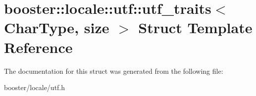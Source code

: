 \section{booster\+:\+:locale\+:\+:utf\+:\+:utf\+\_\+traits$<$ Char\+Type, size $>$ Struct Template Reference}
\label{structbooster_1_1locale_1_1utf_1_1utf__traits}


The documentation for this struct was generated from the following file\+:\begin{DoxyCompactItemize}
\item 
booster/locale/utf.\+h\end{DoxyCompactItemize}
